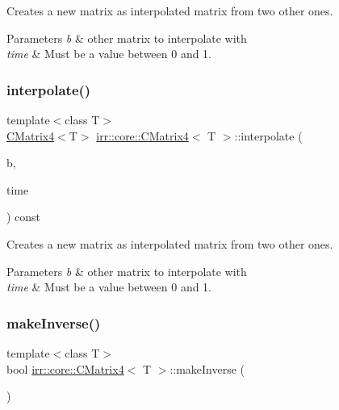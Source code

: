 Creates a new matrix as interpolated matrix from two other ones. 


\begin{DoxyParams}{Parameters}
{\em b} & other matrix to interpolate with \\
\hline
{\em time} & Must be a value between 0 and 1. \\
\hline
\end{DoxyParams}
\mbox{\label{classirr_1_1core_1_1CMatrix4_a6b24a11495e27bc052aef0bfec87eaaf}} 
\subsubsection{\texorpdfstring{interpolate()}{interpolate()}\hspace{0.1cm}{\footnotesize\ttfamily [2/2]}}
{\footnotesize\ttfamily template$<$class T$>$ \\
\hyperlink{classirr_1_1core_1_1CMatrix4}{C\+Matrix4}$<$T$>$ \hyperlink{classirr_1_1core_1_1CMatrix4}{irr\+::core\+::\+C\+Matrix4}$<$ T $>$\+::interpolate (\begin{DoxyParamCaption}\item[{const \hyperlink{classirr_1_1core_1_1CMatrix4}{core\+::\+C\+Matrix4}$<$ T $>$ \&}]{b,  }\item[{\hyperlink{namespaceirr_a0277be98d67dc26ff93b1a6a1d086b07}{f32}}]{time }\end{DoxyParamCaption}) const}



Creates a new matrix as interpolated matrix from two other ones. 


\begin{DoxyParams}{Parameters}
{\em b} & other matrix to interpolate with \\
\hline
{\em time} & Must be a value between 0 and 1. \\
\hline
\end{DoxyParams}
\mbox{\label{classirr_1_1core_1_1CMatrix4_a3fbface2cb6b959af64f82a5bb17540e}} 
\subsubsection{\texorpdfstring{make\+Inverse()}{makeInverse()}\hspace{0.1cm}{\footnotesize\ttfamily [1/2]}}
{\footnotesize\ttfamily template$<$class T$>$ \\
bool \hyperlink{classirr_1_1core_1_1CMatrix4}{irr\+::core\+::\+C\+Matrix4}$<$ T $>$\+::make\+Inverse (\begin{DoxyParamCaption}{ }\end{DoxyParamCaption})}



